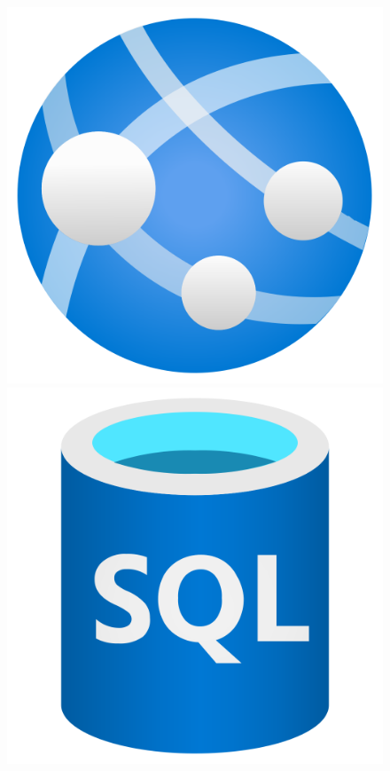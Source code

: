 \documentclass[10pt]{beamer}
\begin{document}
\begin{frame}
	\begin{figure}
		\centering
		\begin{minipage}{.15\linewidth}
			\centering
			\includegraphics[width=0.9\linewidth]{./images/App-Services.png}
		\end{minipage}\hfill
		\begin{minipage}{.15\linewidth}
			\centering
			\includegraphics[width=0.9\linewidth]{./images/SQL-Database.png}

\end{minipage}
\end{figure}
\end{frame}
\end{document}
